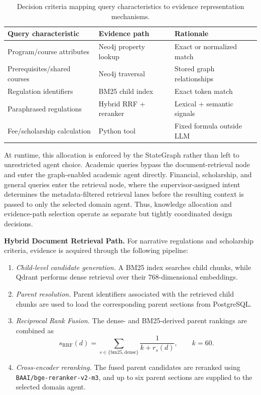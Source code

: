 \begin{table}[h!]
\centering
\caption{Decision criteria mapping query characteristics to evidence representation mechanisms.}
\label{tab:decision_criteria}
\setlength{\tabcolsep}{3pt}
\begin{tabular}{>{\raggedright\arraybackslash}p{}>{\raggedright\arraybackslash}p{}>{\raggedright\arraybackslash}p{}}
\toprule
\textbf{Query characteristic} & \textbf{Evidence path} & \textbf{Rationale} \\
\midrule
Program/course attributes & Neo4j property lookup & Exact or normalized match \\
Prerequisites/shared courses & Neo4j traversal & Stored graph relationships \\
Regulation identifiers & BM25 child index & Exact token match \\
Paraphrased regulations & Hybrid RRF + reranker & Lexical + semantic signals \\
Fee/scholarship calculation & Python tool & Fixed formula outside LLM \\
\bottomrule
\end{tabular}
\end{table}

At runtime, this allocation is enforced by the StateGraph rather than left to unrestricted agent choice. Academic queries bypass the document-retrieval node and enter the graph-enabled academic agent directly. Financial, scholarship, and general queries enter the retrieval node, where the supervisor-assigned intent determines the metadata-filtered retrieval lanes before the resulting context is passed to only the selected domain agent. Thus, knowledge allocation and evidence-path selection operate as separate but tightly coordinated design decisions.

\textbf{Hybrid Document Retrieval Path.}
For narrative regulations and scholarship criteria, evidence is acquired
through the following pipeline:

\begin{enumerate}
    \item \emph{Child-level candidate generation.}
    A BM25 index searches child chunks, while Qdrant performs dense retrieval
    over their 768-dimensional embeddings.

    \item \emph{Parent resolution.}
    Parent identifiers associated with the retrieved child chunks are used to
    load the corresponding parent sections from PostgreSQL.

    \item \emph{Reciprocal Rank Fusion.}
    The dense- and BM25-derived parent rankings are combined as
    \[
        s_{\mathrm{RRF}}(d)
        = \sum_{s\in\{\mathrm{bm25},\mathrm{dense}\}}
          \frac{1}{k+r_s(d)}, \qquad k=60.
    \]

    \item \emph{Cross-encoder reranking.}
    The fused parent candidates are reranked using
    \texttt{BAAI/bge-reranker-v2-m3}, and up to six parent sections are
    supplied to the selected domain agent.
\end{enumerate}

